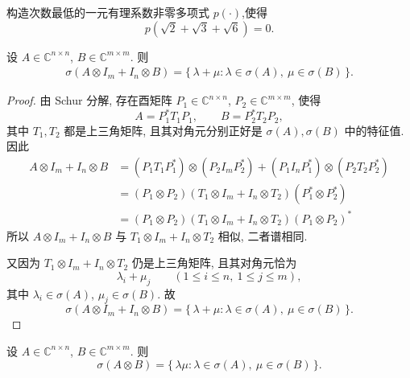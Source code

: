 \begin{problem}[选做]
构造次数最低的一元有理系数非零多项式 $p(\cdot)$,使得
\[
p(\sqrt2+\sqrt3+\sqrt6)=0.
\]

\begin{solution}
    \begin{sollemma}
        设 $A\in\mathbb C^{n\times n}$, $B\in\mathbb C^{m\times m}$. 则
        \begin{gather*}
            \sigma(A \otimes I_m + I_n \otimes B)
            =
            \{\,\lambda+\mu:\lambda\in\sigma(A),\ \mu\in\sigma(B)\,\}.
        \end{gather*}

    \end{sollemma}

    \begin{proof}[Proof]
        由 Schur 分解, 存在酉矩阵 $P_1\in\mathbb C^{n\times n}$, $P_2\in\mathbb C^{m\times m}$, 使得
        \[
            A=P_1^*T_1P_1,\qquad B=P_2^*T_2P_2,
        \]
        其中 $T_1,T_2$ 都是上三角矩阵, 且其对角元分别正好是 $\sigma(A),\sigma(B)$ 中的特征值.
        因此
        \begin{align*}
            A \otimes I_m + I_n \otimes B
            &=(P_1 T_1 P_1^*)\otimes(P_2 I_m P_2^*) + (P_1 I_n P_1^*)\otimes(P_2 T_2 P_2^*) \\
            &=(P_1 \otimes P_2)(T_1 \otimes I_m + I_n \otimes T_2)(P_1^* \otimes P_2^*) \\
            &=(P_1 \otimes P_2)(T_1 \otimes I_m + I_n \otimes T_2)(P_1 \otimes P_2)^*
        \end{align*}
        所以 $A \otimes I_m + I_n \otimes B$ 与 $T_1 \otimes I_m + I_n \otimes T_2$ 相似, 二者谱相同.

        又因为 $T_1 \otimes I_m + I_n \otimes T_2$ 仍是上三角矩阵, 且其对角元恰为
        \[
            \lambda_i+\mu_j
            \qquad
            (1\le i\le n,\ 1\le j\le m),
        \]
        其中 $\lambda_i\in\sigma(A)$, $\mu_j\in\sigma(B)$. 故
        \[
            \sigma(A \otimes I_m + I_n \otimes B)
            =
            \{\,\lambda+\mu:\lambda\in\sigma(A),\ \mu\in\sigma(B)\,\}.
        \]
    \end{proof}

    \begin{sollemma}
        设 $A\in\mathbb C^{n\times n}$, $B\in\mathbb C^{m\times m}$. 则
        \[
            \sigma(A \otimes B)
            =
            \{\,\lambda\mu:\lambda\in\sigma(A),\ \mu\in\sigma(B)\,\}.
        \]
    \end{sollemma}


\end{solution}
\end{problem}

